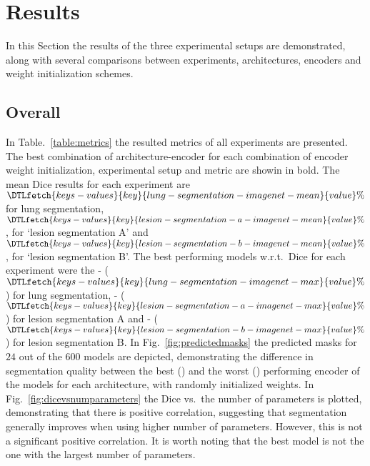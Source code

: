 \documentclass{elsarticle}
\begin{document}
\section{Results}\label{sec:results}
In this Section the results of the three experimental setups are demonstrated, along with several comparisons between experiments, architectures, encoders and weight initialization schemes.

\subsection{Overall}
In Table.~\ref{table:metrics} the resulted metrics of all experiments are presented.
The best combination of architecture-encoder for each combination of encoder weight initialization, experimental setup and metric are showin in bold.
The mean Dice results for each experiment are $\DTLfetch{keys-values}{key}{lung-segmentation-imagenet-mean}{value}\%$ for lung segmentation, $\DTLfetch{keys-values}{key}{lesion-segmentation-a-imagenet-mean}{value}\%$, for `lesion segmentation A' and $\DTLfetch{keys-values}{key}{lesion-segmentation-b-imagenet-mean}{value}\%$, for `lesion segmentation B'.
The best performing models w.r.t.\ Dice for each experiment were the - ($\DTLfetch{keys-values}{key}{lung-segmentation-imagenet-max}{value}\%$) for lung segmentation, - ($\DTLfetch{keys-values}{key}{lesion-segmentation-a-imagenet-max}{value}\%$) for lesion segmentation A and - ($\DTLfetch{keys-values}{key}{lesion-segmentation-b-imagenet-max}{value}\%$) for lesion segmentation B. %
In Fig.~\ref{fig:predictedmasks} the predicted masks for $24$ out of the $600$ models are depicted, demonstrating the difference in segmentation quality between the best () and the worst () performing encoder of the models for each architecture, with randomly initialized weights.
In Fig.~\ref{fig:dicevsnumparameters} the Dice vs.\ the number of parameters is plotted, demonstrating that there is positive correlation, suggesting that segmentation generally improves when using higher number of parameters.
However, this is not a significant positive correlation.
It is worth noting that the best model is not the one with the largest number of parameters.
\end{document}
